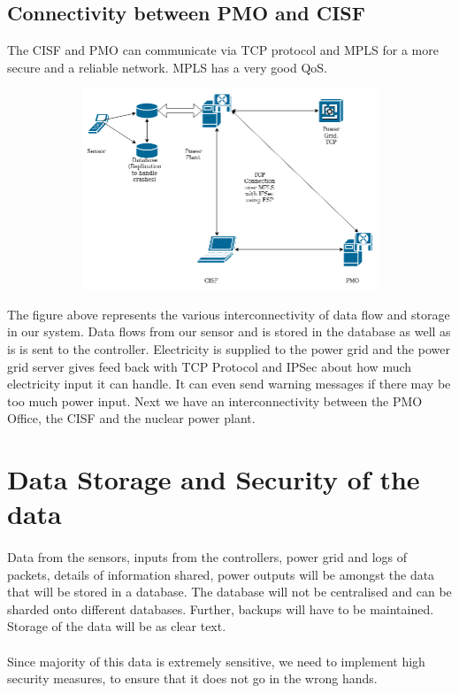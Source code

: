 \documentclass{article}
\begin{document}
\subsection{Connectivity between PMO and CISF}
The CISF and PMO can communicate via TCP protocol and MPLS for a more secure and a reliable network. MPLS has a very good QoS.



\begin{figure}[htb]
	\centering
	\includegraphics[width=12cm,height=6cm]{ass.png}
\end{figure}
The figure above represents the various interconnectivity of data flow and storage in our system. Data flows from our sensor and is stored in the database as well as is is sent to the controller.
Electricity is supplied to the power grid and the power grid server gives feed back with TCP Protocol and IPSec about how much electricity input it can handle. It can even send warning messages if there may be too much power input. Next we have an interconnectivity between the PMO Office, the CISF and the nuclear power plant. 
\section{Data Storage and Security of the data}
\paragraph{}
Data from the sensors, inputs from the controllers, power grid and logs of packets, details of information shared, power outputs will be amongst the  data that will be stored in a database. 
The database will not be centralised and can be sharded onto different databases. Further, backups will have to be maintained. Storage of the data will be as clear text.
\paragraph{}
Since majority of this data is extremely sensitive, we need to implement high security measures, to ensure that it does not go in the wrong hands.
\end{document}
